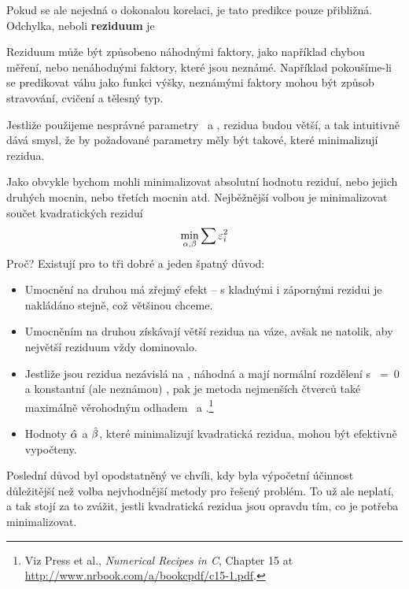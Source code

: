 \documentclass[12pt]{book}
\begin{document}
Pokud se ale nejedná o dokonalou korelaci, je tato predikce pouze přibližná. Odchylka, neboli {\bf reziduum} je


Reziduum může být způsobeno náhodnými faktory, jako například chybou měření, nebo nenáhodnými faktory, které jsou neznámé. Například pokoušíme-li se predikovat váhu jako funkci výšky, neznámými faktory mohou být způsob stravování, cvičení a tělesný typ.

Jestliže použijeme nesprávné parametry \myinter~a \myslope, rezidua budou větší, a tak intuitivně dává smysl, že by požadované parametry měly být takové, které minimalizují rezidua.


Jako obvykle bychom mohli minimalizovat absolutní hodnotu reziduí, nebo jejich druhých mocnin, nebo třetích mocnin atd. Nejběžnější volbou je minimalizovat součet kvadratických reziduí
%
\[ \min_{\alpha, \beta} \sum \varepsilon_i^2 \]
%
Proč?  Existují pro to tři dobré a jeden špatný důvod:

\begin{itemize}

\item Umocnění na druhou má zřejmý efekt -- s kladnými i zápornými rezidui je nakládáno stejně, což většinou chceme.

\item Umocněním na druhou získávají větší rezidua na váze, avšak ne natolik, aby největší reziduum vždy dominovalo.

\item Jestliže jsou rezidua nezávislá na \x, náhodná a mají normální rozdělení s
  \mymu~=~0 a konstantní (ale neznámou) \mysigma, pak je metoda nejmenších čtverců také maximálně věrohodným odhadem \myinter~a \myslope.\footnote{Viz Press et al., {\em Numerical Recipes in C},
    Chapter 15 at \url{http://www.nrbook.com/a/bookcpdf/c15-1.pdf}.}

\item Hodnoty $\hat{\alpha}$ a $\hat{\beta}$, které minimalizují kvadratická rezidua, mohou být efektivně vypočteny.

\end{itemize}

Poslední důvod byl opodstatněný ve chvíli, kdy byla výpočetní účinnost důležitější než volba nejvhodnější metody pro řešený problém. To už ale neplatí, a tak stojí za to zvážit, jestli kvadratická rezidua jsou opravdu tím, co je potřeba minimalizovat.
\end{document}
